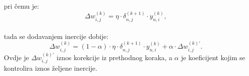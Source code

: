 pri čemu je:\\
\begin{equation}
    \Delta w_{i, j}^{(k)} = \eta \cdot \delta_{n, j}^{(k + 1)} \cdot y_{n, i}^{(k)},\label{eq:delta-w}
\end{equation}\\
tada se dodavanjem inercije dobije:\\
\begin{equation}
    \Delta w_{i, j}^{(k)} = (1 - \alpha) \cdot \eta \cdot \delta_{n, j}^{(k + 1)} \cdot y_{n, i}^{(k)} +
    \alpha \cdot \Delta w_{i, j}^{(k)'}.\label{eq:w-inertia-correction}
\end{equation}
Ovdje je $\Delta w_{i, j}^{(k)'}$ iznos korekcije iz prethodnog koraka, a $\alpha$ je koeficijent kojim se kontrolira iznos
željene inercije.
